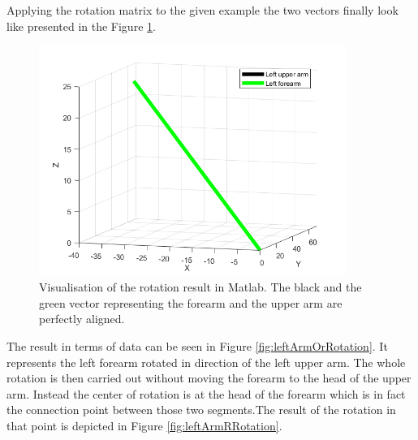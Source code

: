 Applying the rotation matrix to the given example the two vectors finally look like presented in the Figure \ref{fig:matlab2}.

\begin{figure} [!htb]
    \centering
	\includegraphics[width=10cm]{content/images/matlab2}
	\caption{Visualisation of the rotation result in Matlab. The black and the green vector representing the forearm and the upper arm are perfectly aligned.} 
	\label{fig:matlab2}
\end{figure}

The result in terms of data can be seen in Figure \ref{fig:leftArmOrRotation}. It represents the left forearm rotated in direction of the left upper arm. The whole rotation is then carried out without moving the forearm to the head of the upper arm. Instead the center of rotation is at the head of the forearm which is in fact the connection point between those two segments.The result of the rotation in that point is depicted in Figure \ref{fig:leftArmRRotation}.

